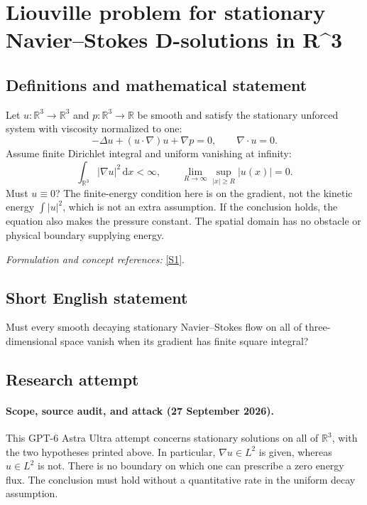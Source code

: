 \documentclass[11pt]{article}
\begin{document}
\section*{\texorpdfstring{Liouville problem for stationary Navier–Stokes D-solutions in R\textasciicircum{}3}{Liouville problem for stationary Navier–Stokes D-solutions in R\textasciicircum{}3}}\label{30006966}
\subsection{Definitions and mathematical statement}
Let $u:{\mathbb{R}}^3\to{\mathbb{R}}^3$ and $p:{\mathbb{R}}^3\to{\mathbb{R}}$ be smooth and satisfy the stationary unforced system with viscosity normalized to one:
\[
 -\Delta u+(u\cdot\nabla)u+\nabla p=0,
 \qquad\nabla\cdot u=0.
\]
Assume finite Dirichlet integral and uniform vanishing at infinity:
\[
 \int_{{\mathbb{R}}^3}|\nabla u|^2{\,\mathrm{d}} x<\infty,
 \qquad \lim_{R\to\infty}\sup_{|x|\ge R}|u(x)|=0.
\]
Must $u\equiv0$? The finite-energy condition here is on the gradient, not the kinetic energy $\int|u|^2$, which is not an extra assumption. If the conclusion holds, the equation also makes the pressure constant. The spatial domain has no obstacle or physical boundary supplying energy.
\par\smallskip\textit{Formulation and concept references:} \href{https://arxiv.org/html/2506.14533v1}{[S1]}.

\subsection{Short English statement}
Must every smooth decaying stationary Navier--Stokes flow on all of three-dimensional space vanish when its gradient has finite square integral?
\subsection{Research attempt}

\paragraph{Scope, source audit, and attack (27 September 2026).}
This GPT-6 Astra Ultra attempt concerns stationary solutions on all of
$\mathbb R^3$, with the two hypotheses printed above. In particular,
$\nabla u\in L^2$ is given, whereas $u\in L^2$ is not. There is no
boundary on which one can prescribe a zero energy flux. The conclusion
must hold without a quantitative rate in the uniform decay assumption.
\end{document}
